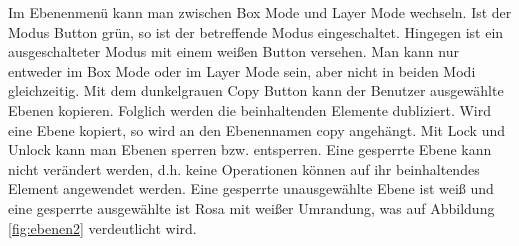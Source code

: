 Im Ebenenmenü kann man zwischen Box Mode und Layer Mode wechseln. Ist der Modus Button grün, so ist der betreffende Modus eingeschaltet. Hingegen ist ein ausgeschalteter Modus mit einem weißen Button versehen. Man kann nur entweder im Box Mode oder im Layer Mode sein, aber nicht in beiden Modi gleichzeitig. Mit dem dunkelgrauen Copy Button kann der Benutzer ausgewählte Ebenen kopieren. Folglich werden die beinhaltenden Elemente dubliziert. Wird eine Ebene kopiert, so wird an den Ebenennamen copy angehängt. Mit Lock und Unlock kann man Ebenen sperren bzw. entsperren. Eine gesperrte Ebene kann nicht verändert werden, d.h. keine Operationen können auf ihr beinhaltendes Element angewendet werden. Eine gesperrte unausgewählte Ebene ist weiß und eine gesperrte ausgewählte ist Rosa mit weißer Umrandung, was auf Abbildung \ref{fig:ebenen2} verdeutlicht wird. 

